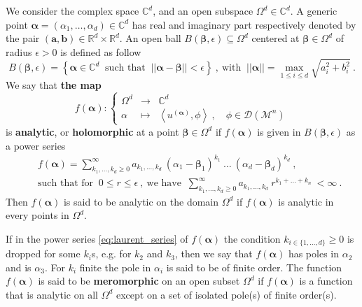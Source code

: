 \documentclass[11pt]{book}
\newcommand{\alphabd}{\boldsymbol{\alpha}}
\newcommand{\betabd}{\boldsymbol{\beta}}
\newcommand{\norm}[1]{\left|\left|#1\right|\right|}
\newcommand{\sm}[1]{\left\langle#1\right\rangle}
\newcommand{\Dcal}{\mathcal{D}}
\newcommand{\Mcal}{\mathcal{M}}
\newcommand{\Cbb}{\mathbb{C}}
\newcommand{\Rbb}{\mathbb{R}}
\theoremstyle{break}
\begin{document}
We consider the complex space $\Cbb^d$, and an open subspace $\Omega^d \in \Cbb^d$. A generic point $\alphabd = \left(\alpha_1 , \dots , \alpha_d\right) \in \Cbb^d$ has real and imaginary part respectively denoted by the pair $(\mathbf{a},\mathbf{b})\in \Rbb^d \times \Rbb^d$. An open ball $B(\betabd,\epsilon)\subseteq\Omega^d$ centered at $\betabd \in \Omega^d$ of radius $\epsilon > 0$ is defined as follow
%
\begin{equation*}
B(\betabd,\epsilon) = \left\{ \alphabd \in \Cbb^d \ \mbox{ such that } \ \norm{\alphabd - \betabd} < \epsilon \right\} \ , \ \mbox{with } \ \norm{\alphabd} = \max_{1\leq i \leq d} \sqrt{a_i^2 + b_i^2} \ .
\end{equation*}
%
We say that \textbf{the map}
%
\begin{equation*}
f(\alphabd) : \left\{
\begin{array}{ccl}
\Omega^d & \to & \Cbb^d \\
\alpha & \mapsto & \sm{u^{(\alphabd)},\phi} \ , \quad \phi \in \Dcal(\Mcal^n)
\end{array}
\right.
\end{equation*}
%
is \textbf{analytic}, or \textbf{holomorphic} at a point $\betabd \in \Omega^d$ if $f(\alphabd)$ is given in $B(\betabd,\epsilon)$ as a power series
%
\begin{eqnarray}
&& f(\alphabd) = \sum_{k_1 , \dots , k_d \geq 0}^\infty a_{k_1 , \dots , k_d} \ (\alpha_1 - \betabd_1)^{k_1} \ \dots \ (\alpha_d - \betabd_d)^{k_d} \ ,
\label{eq:laurent_series} \\
&& \mbox{such that for } \ 0 \leq r \leq \epsilon \ , \ \mbox{we have } \ \sum_{k_1 , \dots , k_d \geq 0}^\infty a_{k_1 , \dots , k_d} \ r^{k_1+\dots+k_n} \ < \infty \ . \nonumber
\end{eqnarray}
%
Then $f(\alphabd)$ is said to be analytic on the domain $\Omega^d$ if $f(\alphabd)$ is analytic in every points in $\Omega^d$. 


If in the power series \eqref{eq:laurent_series} of $f(\alphabd)$ the condition $k_{i\in\{1,\dots,d\}} \geq 0$ is dropped for some $k_i$s, e.g. for $k_2$ and $k_3$, then we say that $f(\alphabd)$ has poles in $\alpha_2$ and is $\alpha_3$. For $k_i$ finite the pole in $\alpha_i$ is said to be of finite order. The function $f(\alphabd)$ is said to be \textbf{meromorphic} on an open subset $\Omega^d$ if $f(\alphabd)$ is a function that is analytic on all $\Omega^d$ except on a set of isolated pole(s) of finite order(s).


\bigskip
\end{document}
